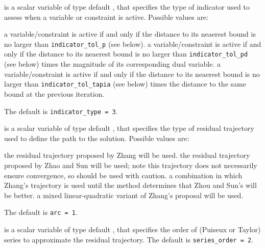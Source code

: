 \begin{description}

 is a scalar variable of type default \integer,
that specifies the type of indicator used to assess when a variable or
constraint is active.
Possible values are:

\begin{description}
 a variable/constraint is active if and only if the distance
to its neaerest bound is no larger than {\tt indicator\-\_tol\_p} (see below).
 a variable/constraint is active if and only if the distance
to its neaerest bound is no larger than {\tt indicator\-\_tol\_pd}
(see below) times the magnitude of its corresponding dual variable.
 a variable/constraint is active if and only if the distance
to its neaerest bound is no larger than {\tt indicator\-\_tol\_tapia}
(see below) times the distance to the same bound at the previous iteration.
\end{description}
The default is {\tt indicator\_type = 3}.

 is a scalar variable of type default \integer,
that specifies the type of residual trajectory used to define the path
to the solution.
Possible values are:

\begin{description}
 the residual trajectory proposed by Zhang will be used.
 the residual trajectory proposed by Zhao and Sun will be used; note
this trajectory does not necessarily ensure convergence, so should be used
with caution.
 a combination in which Zhang's trajectory is used until the
method determines that Zhou and Sun's will be better.
 a mixed linear-quadratic variant of Zhang's proposal will be used.
\end{description}
The default is {\tt arc = 1}.

 is a scalar variable of type default \integer, that
specifies the order of (Puiseux or Taylor) series to approximate the
residual trajectory. The default is {\tt series\_order = 2}.


\end{description}
